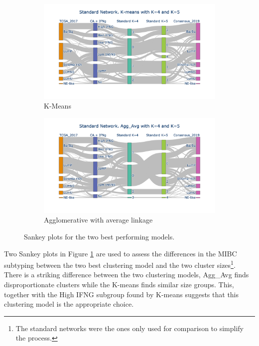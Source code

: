 {\begin{figure}[!htb]
    \hfill
    \begin{subfigure}[b]{0.49\textwidth}
        \centering
        \includegraphics[width=\textwidth,keepaspectratio]{Sections/Network_I/Resources/P0/Sankey_KM_4K_v3.png}
        \caption{K-Means}
    \end{subfigure}
    \hfill
    \begin{subfigure}[b]{0.49\textwidth}
        \centering
        \includegraphics[width=\textwidth,keepaspectratio]{Sections/Network_I/Resources/P0/Sankey_Avg_4K_v3.png}
        \caption{Agglomerative with average linkage}
    \end{subfigure}
    \hfill
    \caption{Sankey plots for the two best performing models. }
    \label{fig:N_I:p0_sky_Agg_KMeans}
\end{figure}


Two Sankey plots in Figure \ref{fig:N_I:p0_sky_Agg_KMeans} are used to assess the differences in the MIBC subtyping between the two best clustering model and the two cluster sizes\footnote{The standard networks were the ones only used for comparison to simplify the process.}. There is a striking difference between the two clustering models, Agg\_Avg finds disproportionate clusters while the K-means finds similar size groups. This, together with the High IFNG subgroup found by K-means suggests that this clustering model is the appropriate choice. 

}
